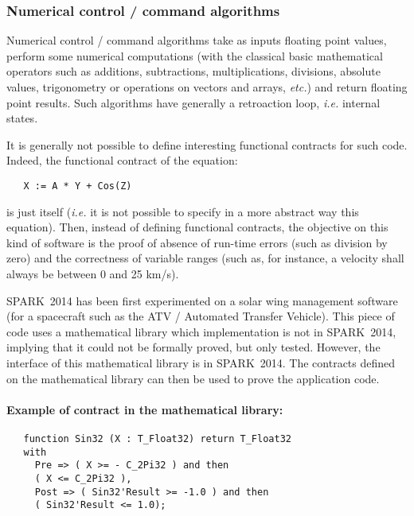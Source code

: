 \documentclass[10pt,a4paper,twocolumn]{article}
\newcommand{\newspark}{SPARK~2014\xspace}
\newcommand{\etc}{\textit{etc.}\xspace}
\newcommand{\ie}{\textit{i.e.}\xspace}
\begin{document}
\subsubsection{Numerical control / command algorithms}

\ifdefined\abstractonly
\else
Numerical control / command algorithms take as inputs floating point values, perform some numerical computations (with the classical basic mathematical operators such as additions, subtractions, multiplications, divisions, absolute values, trigonometry or operations on vectors and arrays, \etc) and return floating point results. Such algorithms have generally a retroaction loop, \ie internal states.

It is generally not possible to define interesting functional contracts for such code. Indeed, the functional contract of the equation:

\begin{verbatim}
   X := A * Y + Cos(Z)
\end{verbatim}

\noindent
is just itself (\ie it is not possible to specify in a more abstract way this equation). Then, instead of defining functional contracts, the objective on this kind of software is the proof of absence of run-time errors (such as division by zero) and the correctness of variable ranges (such as, for instance, a velocity shall always be between 0 and 25 km/s).
\fi

\newspark has been first experimented on a solar wing management software (for a spacecraft such as the ATV / Automated Transfer Vehicle).
This piece of code uses a mathematical library which implementation is not in \newspark, implying that it could not be formally proved, but only tested. However, the interface of this mathematical library is in \newspark. The contracts defined on the mathematical library can then be used to prove the application code.

\ifdefined\abstractonly
\else
\paragraph{Example of contract in the mathematical library:}

\begin{verbatim}
   function Sin32 (X : T_Float32) return T_Float32
   with
     Pre => ( X >= - C_2Pi32 ) and then
     ( X <= C_2Pi32 ),
     Post => ( Sin32'Result >= -1.0 ) and then
     ( Sin32'Result <= 1.0);
\end{verbatim}
\fi
\end{document}

